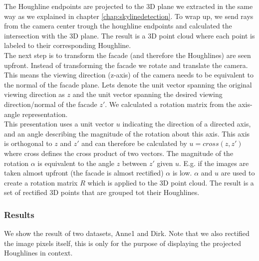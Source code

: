 The Houghline endpoints are projected to the 3D plane we extracted in the same
way as we explained in chapter \ref{chap:skylinedetection}. To wrap up, we send
rays from the camera center trough the houghline endpoints and calculated the
intersection with the 3D plane.  The result is a 3D point cloud where each
point is labeled to their corresponding Houghline.\\

The next step is to transform the facade (and therefore the Houghlines) are
seen upfront. Instead of transforming the facade we rotate and translate the camera. 
This means the viewing direction (z-axis) of the camera needs
to be equivalent to the normal of the facade plane. Lets denote the
unit vector spanning the original viewing direction as $z$ and the
unit vector spanning the desired viewing direction/normal of the facade $z'$.
We calculated a rotation matrix from the axis-angle representation.\\

This presentation uses a unit vector $u$ indicating the direction of a directed axis, and an
angle describing the magnitude of the rotation about this axis.
This axis is orthogonal to $z$ and $z'$ and can therefore be
calculated by $u = cross(z,z')$ where cross defines the cross product of
two vectors.
The magnitude of the rotation $\alpha$ is equivalent to the angle $z$ between $z'$ given $u$. 
E.g. if the images are taken almost upfront (the facade is almost rectified) $\alpha$ is low.
$\alpha$ and $u$ are used to create a rotation matrix $R$ which is applied to the 3D point cloud.
The result is a set of rectified 3D points that are grouped tot their Houghlines.

\subsubsection{Results} %
We show the result of two datasets, Anne1 and Dirk.
Note that we also rectified the image pixels itself, this is only for
the purpose of displaying the projected Houghlines in context.


\newpage
{}

\newpage
{}




